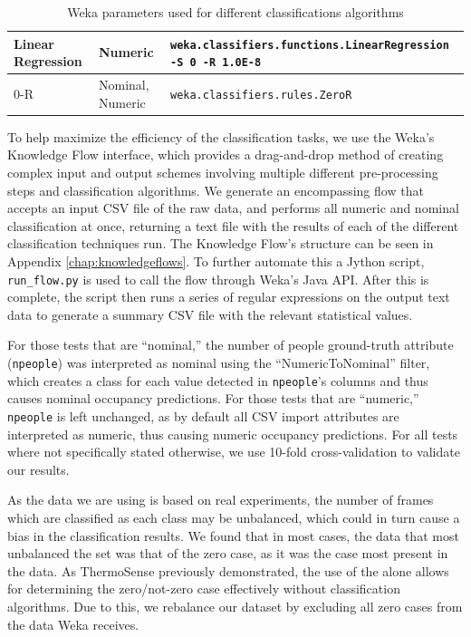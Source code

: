 \documentclass[../thesis/thesis.tex]{subfiles}
\begin{document}
\begin{table}
\begin{tabular}{|p{40mm}|p{20mm}|p{70mm}|}
Linear Regression & Numeric & \texttt{weka.classifiers.functions\newline.LinearRegression \newline -S 0 -R 1.0E-8} \\ \hline

0-R & Nominal, \newline Numeric & \texttt{weka.classifiers.rules.ZeroR} \\ \hline
\end{tabular}
\caption{Weka parameters used for different classifications algorithms}
\label{tab:methods:params}
\end{table}

To help maximize the efficiency of the classification tasks, we use the Weka's Knowledge Flow interface, which provides a drag-and-drop method of creating complex input and output schemes involving multiple different pre-processing steps and classification algorithms. We generate an encompassing flow that accepts an input CSV file of the raw data, and performs all numeric and nominal classification at once, returning a text file with the results of each of the different classification techniques run. The Knowledge Flow's structure can be seen in Appendix \ref{chap:knowledgeflows}. To further automate this a Jython script, \texttt{run\_flow.py} is used to call the flow through Weka's Java API. After this is complete, the script then runs a series of regular expressions on the output text data to generate a summary CSV file with the relevant statistical values.

For those tests that are ``nominal,'' the number of people ground-truth attribute (\texttt{npeople}) was interpreted as nominal using the ``NumericToNominal'' filter, which creates a class for each value detected in \texttt{npeople}'s columns and thus causes nominal occupancy predictions. For those tests that are ``numeric,'' \texttt{npeople} is left unchanged, as by default all CSV import attributes are interpreted as numeric, thus causing numeric occupancy predictions. For all tests where not specifically stated otherwise, we use 10-fold cross-validation to validate our results.

As the data we are using is based on real experiments, the number of frames which are classified as each class may be unbalanced, which could in turn cause a bias in the classification results. We found that in most cases, the data that most unbalanced the set was that of the zero case, as it was the case most present in the data. As ThermoSense previously demonstrated, the use of the \pir alone allows for determining the zero/not-zero case effectively without classification algorithms. Due to this, we rebalance our dataset by excluding all zero cases from the data Weka receives.
\end{document}
